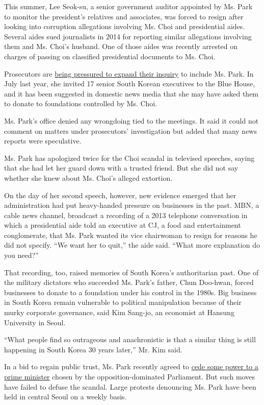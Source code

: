This summer, Lee Seok-su, a senior government auditor appointed by Ms.
Park to monitor the president's relatives and associates, was forced to
resign after looking into corruption allegations involving Ms. Choi and
presidential aides. Several aides sued journalists in 2014 for reporting
similar allegations involving them and Ms. Choi's husband. One of those
aides was recently arrested on charges of passing on classified
presidential documents to Ms. Choi.

Prosecutors are
\href{http://www.nytimes.com/2016/11/04/world/asia/south-korea-park-geun-hye-investigation.html}{being
pressured to expand their inquiry} to include Ms. Park. In July last
year, she invited 17 senior South Korean executives to the Blue House,
and it has been suggested in domestic news media that she may have asked
them to donate to foundations controlled by Ms. Choi.

Ms. Park's office denied any wrongdoing tied to the meetings. It said it
could not comment on matters under prosecutors' investigation but added
that many news reports were speculative.

Ms. Park has apologized twice for the Choi scandal in televised
speeches, saying that she had let her guard down with a trusted friend.
But she did not say whether she knew about Ms. Choi's alleged extortion.

On the day of her second speech, however, new evidence emerged that her
administration had put heavy-handed pressure on businesses in the past.
MBN, a cable news channel, broadcast a recording of a 2013 telephone
conversation in which a presidential aide told an executive at CJ, a
food and entertainment conglomerate, that Ms. Park wanted its vice
chairwoman to resign for reasons he did not specify. ``We want her to
quit,'' the aide said. ``What more explanation do you need?''

That recording, too, raised memories of South Korea's authoritarian
past. One of the military dictators who succeeded Ms. Park's father,
Chun Doo-hwan, forced businesses to donate to a foundation under his
control in the 1980s. Big business in South Korea remain vulnerable to
political manipulation because of their murky corporate governance, said
Kim Sang-jo, an economist at Hansung University in Seoul.

``What people find so outrageous and anachronistic is that a similar
thing is still happening in South Korea 30 years later,'' Mr. Kim said.

In a bid to regain public trust, Ms. Park recently agreed to
\href{http://www.nytimes.com/2016/11/08/world/asia/south-korea-park-choi-scandal-parliament.html}{cede
some power to a prime minister} chosen by the opposition-dominated
Parliament. But such moves have failed to defuse the scandal. Large
protests denouncing Ms. Park have been held in central Seoul on a weekly
basis.

